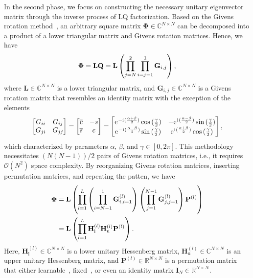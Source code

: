 In the second phase, we focus on constructing the necessary unitary eigenvector matrix through the inverse process of LQ factorization. Based on the Givens rotation method~\citep{doi:10.1137/0106004}, an arbitrary square matrix $\bm{\Phi} \in \mathbb{C}^{N \times N}$ can be decomposed into a product of a lower triangular matrix and Givens rotation matrices. Hence, we have
\begin{equation}\label{eq:givens_lq}
\centering
\bm{\Phi} 
= \mathbf{L}\mathbf{Q} 
= \mathbf{L}\left(\prod_{j=N}^{2}\prod_{i=j-1}^{1}\mathbf{G}_{i,j}\right),
\end{equation}
where $\mathbf{L} \in \mathbb{C}^{N \times N}$ is a lower triangular matrix, and $\mathbf{G}_{i,j} \in \mathbb{C}^{N \times N}$ is a Givens rotation matrix that resembles an identity matrix with the exception of the elements
\begin{equation}\label{eq:givens_rotation_matrix}
\centering
\begin{bmatrix}
G_{ii} & G_{ij} \\
G_{ji} & G_{jj}
\end{bmatrix} =
\begin{bmatrix}
\overline{c} & -s \\
\overline{s} & c
\end{bmatrix} =
\begin{bmatrix}
\eu^{-\ramuno(\frac{\alpha+\beta}{2})}\cos{(\frac{\gamma}{2})} 
& -\eu^{\ramuno(\frac{\alpha-\beta}{2})}\sin{(\frac{\gamma}{2})} \\
\eu^{-\ramuno(\frac{\alpha-\beta}{2})}\sin{(\frac{\gamma}{2})} 
& \eu^{\ramuno(\frac{\alpha+\beta}{2})}\cos{(\frac{\gamma}{2})}
\end{bmatrix},
\end{equation}
which characterized by parameters $\alpha$, $\beta$, and $\gamma \in [0, 2\pi]$. This methodology necessitates ${\left(N(N-1)\right)}/{2}$ pairs of Givens rotation matrices, i.e., it requires $\mathcal{O}(N^{2})$ space complexity. By reorganizing Givens rotation matrices, inserting permutation matrices, and repeating the patten, we have
\begin{equation}\label{eq:givens_lhhp}
\centering
\begin{split}
\bm{\Phi} 
&= \mathbf{L}\left(\prod_{l=1}^{L}\left(\prod_{i=N-1}^{1}\mathbf{G}^{(l)}_{i,i+1}\right)\left(\prod_{j=1}^{N-1}\mathbf{G}^{(l)}_{j,j+1}\right)\mathbf{P}^{(l)}\right)\\
&= \mathbf{L}\left(\prod_{l=1}^{L}\mathbf{H}^{(l)}_{\text{l}}\mathbf{H}^{(l)}_{\text{u}}\mathbf{P}^{(l)}\right).
\end{split}
\end{equation}
Here, $\mathbf{H}^{(l)}_{\text{l}} \in \mathbb{C}^{N \times N}$ is a lower unitary Hessenberg matrix, $\mathbf{H}^{(l)}_{\text{u}} \in \mathbb{C}^{N \times N}$ is an upper unitary Hessenberg matrix, and $\mathbf{P}^{(l)} \in \mathbb{R}^{N \times N}$ is a permutation matrix that either learnable~\citep{mena2018learning}, fixed~\citep{pmlr-v162-dao22a}, or even an identity matrix $\mathbf{I}_{N} \in \mathbb{R}^{N \times N}$.

